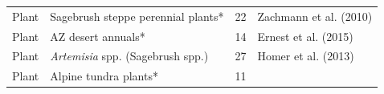 \documentclass[12pt,]{article}
\begin{document}
\begin{longtable}[]{@{}llll@{}}
\begin{minipage}[t]{0.06\columnwidth}\raggedright\strut
Plant\strut
\end{minipage} & \begin{minipage}[t]{0.32\columnwidth}\raggedright\strut
Sagebrush steppe perennial plants*\strut
\end{minipage} & \begin{minipage}[t]{0.22\columnwidth}\raggedright\strut
22\strut
\end{minipage} & \begin{minipage}[t]{0.28\columnwidth}\raggedright\strut
Zachmann et al. (2010)\strut
\end{minipage}\tabularnewline
\begin{minipage}[t]{0.06\columnwidth}\raggedright\strut
Plant\strut
\end{minipage} & \begin{minipage}[t]{0.32\columnwidth}\raggedright\strut
AZ desert annuals*\strut
\end{minipage} & \begin{minipage}[t]{0.22\columnwidth}\raggedright\strut
14\strut
\end{minipage} & \begin{minipage}[t]{0.28\columnwidth}\raggedright\strut
Ernest et al. (2015)\strut
\end{minipage}\tabularnewline
\begin{minipage}[t]{0.06\columnwidth}\raggedright\strut
Plant\strut
\end{minipage} & \begin{minipage}[t]{0.32\columnwidth}\raggedright\strut
\emph{Artemisia} spp. (Sagebrush spp.)\strut
\end{minipage} & \begin{minipage}[t]{0.22\columnwidth}\raggedright\strut
27\strut
\end{minipage} & \begin{minipage}[t]{0.28\columnwidth}\raggedright\strut
Homer et al. (2013)\strut
\end{minipage}\tabularnewline
\begin{minipage}[t]{0.06\columnwidth}\raggedright\strut
Plant\strut
\end{minipage} & \begin{minipage}[t]{0.32\columnwidth}\raggedright\strut
Alpine tundra plants*\strut
\end{minipage} & \begin{minipage}[t]{0.22\columnwidth}\raggedright\strut
11\strut
\end{minipage} & \begin{minipage}[t]{0.28\columnwidth}\raggedright\strut

\end{minipage}
\end{longtable}
\end{document}
